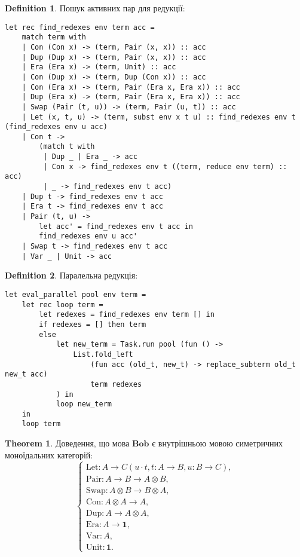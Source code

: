 \documentclass{article}
\theoremstyle{definition}
\newtheorem{theorem}{Theorem}
\newtheorem{definition}{Definition}
\begin{document}
\begin{definition}
Пошук активних пар для редукції:
\begin{lstlisting}[mathescape=true]
let rec find_redexes env term acc =
    match term with
    | Con (Con x) -> (term, Pair (x, x)) :: acc
    | Dup (Dup x) -> (term, Pair (x, x)) :: acc
    | Era (Era x) -> (term, Unit) :: acc
    | Con (Dup x) -> (term, Dup (Con x)) :: acc
    | Con (Era x) -> (term, Pair (Era x, Era x)) :: acc
    | Dup (Era x) -> (term, Pair (Era x, Era x)) :: acc
    | Swap (Pair (t, u)) -> (term, Pair (u, t)) :: acc
    | Let (x, t, u) -> (term, subst env x t u) :: find_redexes env t (find_redexes env u acc)
    | Con t ->
        (match t with
         | Dup _ | Era _ -> acc
         | Con x -> find_redexes env t ((term, reduce env term) :: acc)
         | _ -> find_redexes env t acc)
    | Dup t -> find_redexes env t acc
    | Era t -> find_redexes env t acc
    | Pair (t, u) ->
        let acc' = find_redexes env t acc in
        find_redexes env u acc'
    | Swap t -> find_redexes env t acc
    | Var _ | Unit -> acc
\end{lstlisting}
\end{definition}

\begin{definition}
Паралельна редукція:
\begin{lstlisting}[mathescape=true]
let eval_parallel pool env term =
    let rec loop term =
        let redexes = find_redexes env term [] in
        if redexes = [] then term
        else
            let new_term = Task.run pool (fun () ->
                List.fold_left
                    (fun acc (old_t, new_t) -> replace_subterm old_t new_t acc)
                    term redexes
            ) in
            loop new_term
    in
    loop term
\end{lstlisting}
\end{definition}

\begin{theorem}
Доведення, що мова $\mathbf{Bob}$ є внутрішньою мовою симетричних моноїдальних категорій:
\[
\begin{cases}
   \mathrm{Let} : A \to C (u \cdot t, t: A \to B, u: B \to C), \\
   \mathrm{Pair} : A \rightarrow B \rightarrow A \otimes B, \\
   \mathrm{Swap} : A \otimes B \rightarrow B \otimes A, \\
   \mathrm{Con} : A \otimes A \rightarrow A, \\
   \mathrm{Dup} : A \rightarrow A \otimes A, \\
   \mathrm{Era} : A \rightarrow \mathbf{1}, \\
   \mathrm{Var} : A, \\
   \mathrm{Unit} : \mathbf{1}.
\end{cases}
\]
\end{theorem}
\end{document}

